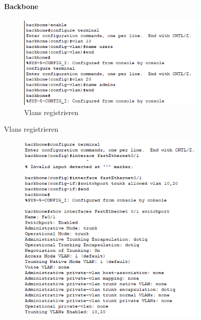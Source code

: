 \begin{figure}[!htb]
    \paragraph{Backbone}
    \centering
    \begin{subfigure}{\textwidth}
        \includegraphics[width=\textwidth]{./img/Backbone/vlan.png}
        \caption{Vlans registrieren}
    \end{subfigure}
\end{figure}
\begin{figure}[!htb]\ContinuedFloat
    \centering
    \begin{subfigure}{\textwidth}
        \includegraphics[width=\textwidth]{./img/Backbone/Access1.png}
    \end{subfigure}
\end{figure}
